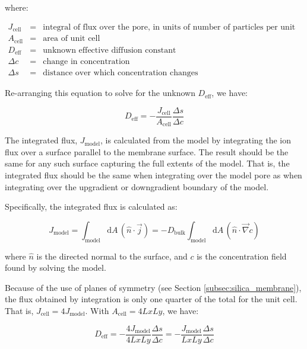 where:

$\begin{array}{rcl}
J_{\text{cell}} & = & \text{integral of flux over the pore, in units of number of particles per unit time} \\
A_{\text{cell}} & = & \text{area of unit cell} \\
D_{\text{eff}} & = & \text{unknown effective diffusion constant} \\
\Delta c & = & \text{change in concentration} \\
\Delta s & = & \text{distance over which concentration changes}
\end{array}$

Re-arranging this equation to solve for the unknown $D_{\mathrm{eff}}$, we have:

\begin{equation}\label{eq:Deff_def}
D_{\mathrm{eff}} = - \frac{J_{\mathrm{cell}}}{A_{\mathrm{cell}}} \frac{\Delta s}{\Delta c}
\end{equation}

The integrated flux, $J_{\mathrm{model}}$, is calculated from the model by integrating
the ion flux over a surface parallel to the membrane surface.
The result should be the same for any such surface capturing the full extents of the model.
That is, the integrated flux should be the same when integrating over the model pore as
when integrating over the upgradient or downgradient boundary of the model.

Specifically, the integrated flux is calculated as:

\begin{equation}
J_{\mathrm{model}} = \int_{\mathrm{model}} \mathrm{d}A\, \left(\hat{n} \cdot \vec{j} \right)
 = - D_{\mathrm{bulk}} \int_{\mathrm{model}} \mathrm{d}A\, \left(\hat{n} \cdot \vec{\nabla} c \right)
\end{equation}

where $\hat{n}$ is the directed normal to the surface,
and $c$ is the concentration field found by solving the model.

Because of the use of planes of symmetry (see Section \ref{subsec:silica_membrane}),
the flux obtained by integration is only one quarter of the total for the unit cell.
That is, $J_{\mathrm{cell}} = 4 J_{\mathrm{model}}$.
With $A_{\mathrm{cell}} = 4 Lx Ly$, we have:

\begin{equation}
D_{\mathrm{eff}} = - \frac{4 J_{\mathrm{model}}}{4 Lx Ly} \frac{\Delta s}{\Delta c}
 = - \frac{J_{\mathrm{model}}}{Lx Ly} \frac{\Delta s}{\Delta c}
\end{equation}

